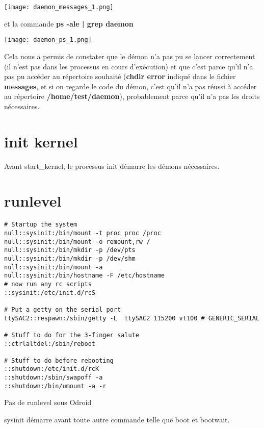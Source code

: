 \begin{center} 
\hspace{15cm}
\texttt{[image: daemon\_messages\_1.png]}
\end{center}
\vspace{0.5cm}

et la commande \textbf{ps -ale | grep daemon}

\begin{center} 
\hspace{15cm}
\texttt{[image: daemon\_ps\_1.png]}
\end{center}
\vspace{0.5cm}

Cela nous a permis de constater que le démon n'a pas pu se lancer correctement (il n'est pas dans les processus en cours d'exécution) et que c'est parce qu'il n'a pas pu accéder au répertoire souhaité (\textbf{chdir error} indiqué dans le fichier \textbf{messages}, et si on regarde le code du démon, c'est qu'il n'a pas réussi à accéder au répertoire \textbf{/home/test/daemon}), probablement parce qu'il n'a pas les droits nécessaires.\\



\section{init kernel}
Avant start\_kernel, le processus init démarre les démons nécessaires. 

\section{runlevel}
\begin{lstlisting}[style=Bash]
# Startup the system
null::sysinit:/bin/mount -t proc proc /proc
null::sysinit:/bin/mount -o remount,rw /
null::sysinit:/bin/mkdir -p /dev/pts
null::sysinit:/bin/mkdir -p /dev/shm
null::sysinit:/bin/mount -a
null::sysinit:/bin/hostname -F /etc/hostname
# now run any rc scripts
::sysinit:/etc/init.d/rcS

# Put a getty on the serial port
ttySAC2::respawn:/sbin/getty -L  ttySAC2 115200 vt100 # GENERIC_SERIAL

# Stuff to do for the 3-finger salute
::ctrlaltdel:/sbin/reboot

# Stuff to do before rebooting
::shutdown:/etc/init.d/rcK
::shutdown:/sbin/swapoff -a
::shutdown:/bin/umount -a -r
\end{lstlisting}
Pas de runlevel sous Odroid

sysinit démarre avant toute autre commande telle que boot et bootwait.
